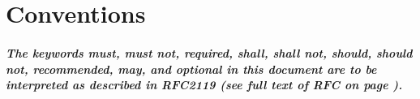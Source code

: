 \chapter*{Conventions}

\paragraph{
The keywords \emph{must}, \emph{must not}, \emph{required}, \emph{shall},
\emph{shall not}, \emph{should}, \emph{should not}, \emph{recommended},
\emph{may}, and \emph{optional} in this document are to be interpreted as
described in RFC2119 (see full text of RFC on page \pageref{app:RFC2119}).
}
